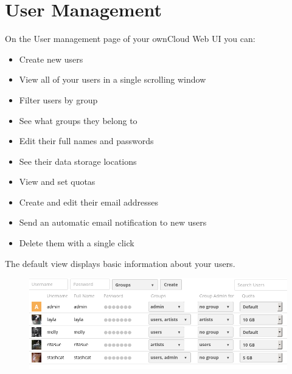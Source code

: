 \documentclass[letterpaper,10pt,english]{sphinxmanual}
\begin{document}
\section{User Management}
\label{configuration_user/user_configuration:user-management}\label{configuration_user/user_configuration::doc}
On the User management page of your ownCloud Web UI you can:
\begin{itemize}
\item {} 
Create new users

\item {} 
View all of your users in a single scrolling window

\item {} 
Filter users by group

\item {} 
See what groups they belong to

\item {} 
Edit their full names and passwords

\item {} 
See their data storage locations

\item {} 
View and set quotas

\item {} 
Create and edit their email addresses

\item {} 
Send an automatic email notification to new users

\item {} 
Delete them with a single click

\end{itemize}

The default view displays basic information about your users.
\begin{figure}[htbp]
\centering

\includegraphics{users-config.png}
\end{figure}
\end{document}
